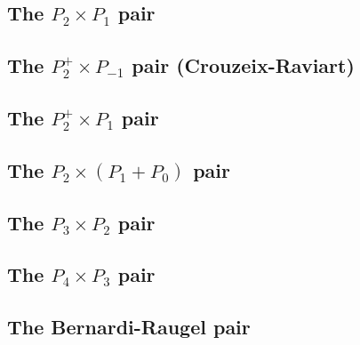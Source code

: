 \subsection{The ${ P}_2\times P_1$ pair \label{ss:p2p1}}


\subsection{The ${ P}_2^+\times P_{-1}$ pair  (Crouzeix-Raviart) } \label{sec:crouzeix-raviart}


\subsection{The ${ P}_2^+\times P_{1}$ pair \label{ss:p2pp1}}


\subsection{The ${ P}_2\times (P_1+P_0)$ pair} \label{ss:p2p1p0}


\subsection{The ${ P}_3\times P_2$ pair} \label{ss:p3p2}


\subsection{The $P_4\times P_3$ pair} \label{ss:p4p3}




\subsection{The Bernardi-Raugel pair} \label{ss:bernardi_raugel}


